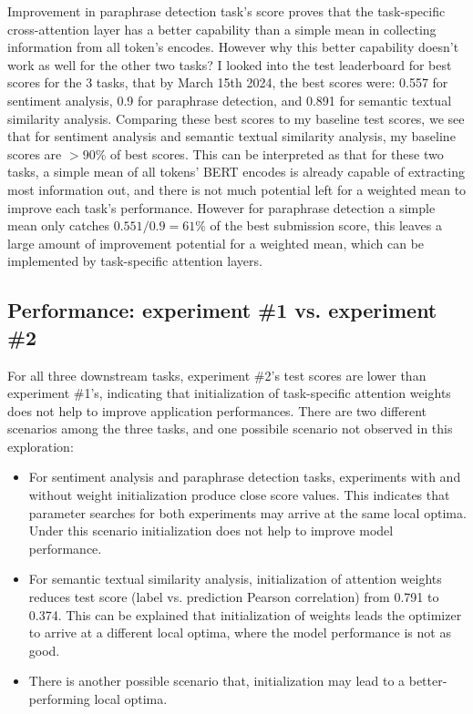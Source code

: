 \documentclass{article}
\begin{document}
Improvement in paraphrase detection task's score proves that the task-specific cross-attention layer has a better capability than a simple mean in collecting information from all token's encodes. However why this better capability doesn't work as well for the other two tasks? I looked into the test leaderboard for best scores for the 3 tasks, that by March 15th 2024, the best scores were: 0.557 for sentiment analysis, 0.9 for paraphrase detection, and 0.891 for semantic textual similarity analysis. Comparing these best scores to my baseline test scores, we see that for sentiment analysis and semantic textual similarity analysis, my baseline scores are $>90\%$ of best scores. This can be interpreted as that for these two tasks, a simple mean of all tokens' BERT encodes is already capable of extracting most information out, and there is not much potential left for a weighted mean to improve each task's performance. However for paraphrase detection a simple mean only catches $0.551 / 0.9 = 61\%$ of the best submission score, this leaves a large amount of improvement potential for a weighted mean, which can be implemented by task-specific attention layers.

\subsection{Performance: experiment \#1 vs. experiment \#2}
\label{perf_exp1_vs_exp2}
For all three downstream tasks, experiment \#2's test scores are lower than experiment \#1's, indicating that initialization of task-specific attention weights does not help to improve application performances. There are two different scenarios among the three tasks, and one possibile scenario not observed in this exploration:
\begin{itemize}
    \item For sentiment analysis and paraphrase detection tasks, experiments with and without weight initialization produce close score values. This indicates that parameter searches for both experiments may arrive at the same local optima. Under this scenario initialization does not help to improve model performance.
    \item For semantic textual similarity analysis, initialization of attention weights reduces test score (label vs. prediction Pearson correlation) from 0.791 to 0.374. This can be explained that initialization of weights leads the optimizer to arrive at a different local optima, where the model performance is not as good. 
    \item There is another possible scenario that, initialization may lead to a better-performing local optima.
\end{itemize}
\end{document}
